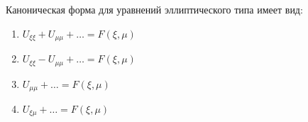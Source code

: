 Каноническая форма для уравнений эллиптического типа имеет вид:

\begin{enumerate}[label=\arabic*)]
    \item \(U_{\xi \xi }+U_{\mu \mu }+\dots =F\left(\xi ,\mu \right)\)
    \item \(U_{\xi \xi }-U_{\mu \mu }+\dots =F\left(\xi ,\mu \right)\)
    \item \(U_{\mu \mu }+\dots =F\left(\xi ,\mu \right)\)
    \item \(U_{\xi \mu }+\dots =F\left(\xi ,\mu \right)\)
\end{enumerate}

